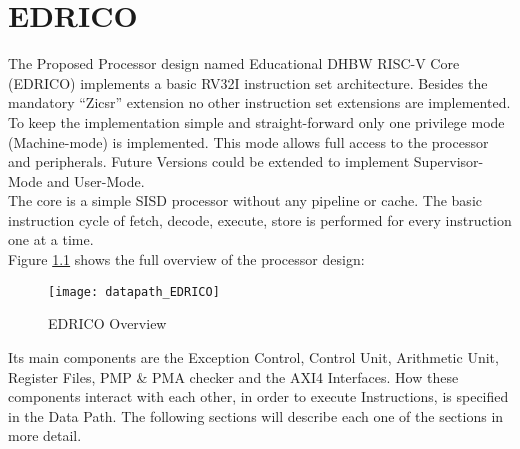 
\chapter{EDRICO}

The Proposed Processor design named Educational DHBW RISC-V Core (EDRICO) implements a basic RV32I
instruction set architecture. Besides the mandatory “Zicsr” extension no other
instruction set extensions are implemented. To keep the implementation simple and
straight-forward only one privilege mode (Machine-mode) is implemented. This mode
allows full access to the processor and peripherals. Future Versions could be
extended to implement Supervisor-Mode and User-Mode.\\
The core is a simple \acf{SISD} processor without any pipeline or cache. The basic instruction cycle of fetch, decode, execute, store is performed for every instruction one at a time.\\
Figure \ref{fig:edricooverview} shows the full overview of the processor design:

\begin{figure}[H]
	\centering
	\texttt{[image: datapath\_EDRICO]}
	\caption{EDRICO Overview}
	\label{fig:edricooverview}
\end{figure}

Its main components are the Exception Control, Control Unit, Arithmetic Unit,
Register Files, PMP \& PMA checker and the AXI4 Interfaces. How these components interact with each other, in order to execute Instructions, is specified in the Data Path.
The following sections will describe each one of the sections in more detail.


